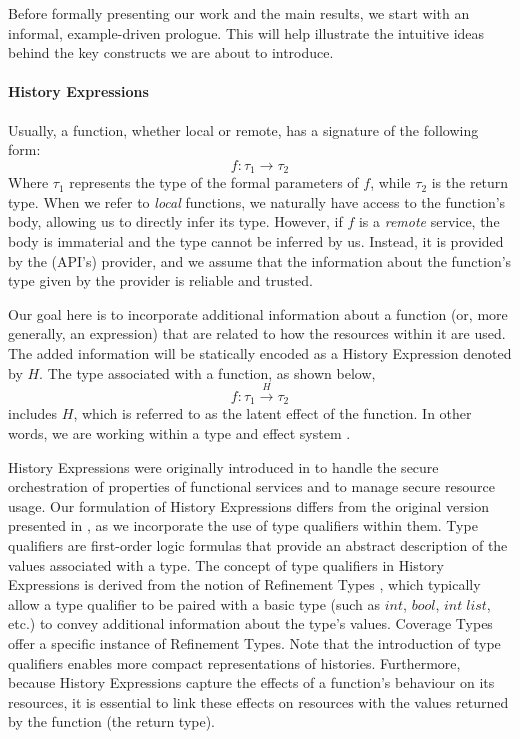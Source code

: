 Before formally presenting our work and the main results, we start with an informal, example-driven prologue. This will help illustrate the intuitive ideas behind the key constructs we are about to introduce.

\paragraph{History Expressions}
Usually, a function, whether local or remote, has a signature of the following form:
\begin{equation}
    f: \tau_1 \longrightarrow \tau_2
\end{equation}
Where $\tau_1$ represents the type of the formal parameters of $f$, while $\tau_2$ is the return type. When we refer to \emph{local} functions, we naturally have access to the function’s body, allowing us to directly infer its type. However, if $f$ is a \emph{remote} service, the body is immaterial and the type cannot be inferred by us. Instead, it is provided by the (API's) provider, and we assume that the information about the function’s type given by the provider is reliable and trusted.

Our goal here is to incorporate additional information about a function (or, more generally, an expression) that are related to how the resources within it are used.
The added information will be statically encoded as a History Expression denoted by $H$. 
The type associated with a function, as shown below,
\begin{equation}
    f: \tau_1 \overset{H}{\longrightarrow} \tau_2
\end{equation}
includes $H$, which is referred to as the latent effect of the function. In other words, we are working within a type and effect system \cite{types-effects-general,static3-types-effects}.

History Expressions were originally introduced in \cite{history} to handle the secure orchestration of properties of functional services and to manage secure resource usage. Our formulation of History Expressions differs from the original version presented in \cite{history}, as we incorporate the use of type qualifiers within them. Type qualifiers are first-order logic formulas that provide an abstract description of the values associated with a type. The concept of type qualifiers in History Expressions is derived from the notion of Refinement Types \cite{refinement}, which typically allow a type qualifier to be paired with a basic type (such as $int$, $bool$, $int\;list$, etc.) to convey additional information about the type's values. Coverage Types \cite{coverage} offer a specific instance of Refinement Types. Note that the introduction of type qualifiers enables more compact representations of histories. Furthermore, because History Expressions capture the effects of a function's behaviour on its resources, it is essential to link these effects on resources with the values returned by the function (the return type).

